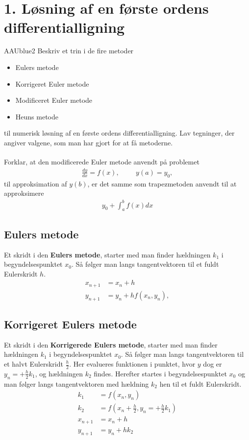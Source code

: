 \section*{1. Løsning af en første ordens differentialligning}
% 
%
\begin{color}{AAUblue2}
%
Beskriv et trin i de fire metoder 
% 
\begin{itemize}
\item Eulers metode 
\item Korrigeret Euler metode 
\item Modificeret Euler metode 
\item Heuns metode 
\end{itemize}
% 
til numerisk løsning af en første ordens differentialligning. 
Lav tegninger, der angiver valgene, som man har gjort for at få metoderne.  
\\\\
Forklar, at den modificerede Euler metode anvendt på problemet 
%
\begin{align*}
\frac{dy}{dx} = f(x), \phantom{heeej} y(a)= y_0,
\end{align*}
% 
til approksimation af $y(b)$, er det samme som trapezmetoden anvendt til at approksimere 
%
\begin{align*}
y_0 + \int_{a}^{b} f(x) dx
\end{align*}
% 
\end{color}
% 
% 
%
\subsection*{Eulers metode}
Et skridt i den \textbf{Eulers metode}, starter med man finder hældningen $k_1$ i begyndelsespunktet $x_0$.
Så følger man langs tangentvektoren til et fuldt Eulerskridt $h$.
%
\begin{align*}
x_{n+1} & = x_n+h \\
y_{n+1} & = y_n + h f(x_n,y_n),
\end{align*}
%

%
\subsection*{Korrigeret Eulers metode}
Et skridt i den \textbf{Korrigerede Eulers metode}, starter med man finder hældningen $k_1$ i begyndelsespunktet $x_0$.
Så følger man langs tangentvektoren til et halvt Eulerskridt $\frac{h}{2}$.
Her evalueres funktionen i punktet, hvor $y$ dog er $ y_n = + \frac{h}{2} k_1$,
og hældningen $k_2$ findes.
Herefter startes i begyndelsespunktet $x_0$ og man følger langs tangentvektoren med hældning $k_2$ hen til et fuldt Eulerskridt.
%
\begin{align*}
k_1 & = f(x_n , y_n) \\
k_2 & = f \left( x_n + \frac{h}{2} , y_n = + \frac{h}{2} k_1 \right)  \\
x_{n+1} & = x_n+h \\
y_{n+1} & = y_n + h k_2 
\end{align*}
%

%

